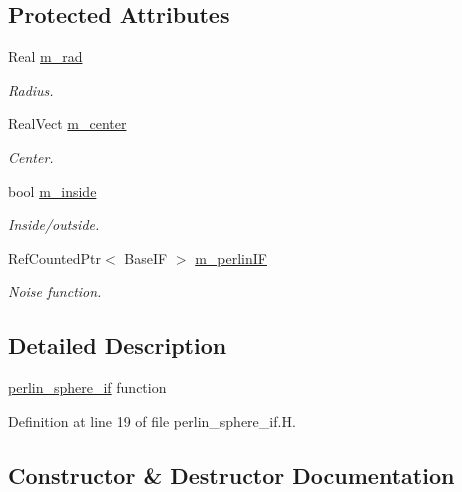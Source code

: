 \subsection*{Protected Attributes}
\begin{DoxyCompactItemize}
\item 
Real \hyperlink{classperlin__sphere__if_a85022e4151bf46031f3e04b25b6ad8b1}{m\+\_\+rad}
\begin{DoxyCompactList}\small\item\em Radius. \end{DoxyCompactList}\item 
Real\+Vect \hyperlink{classperlin__sphere__if_ab57fb2ddeecb83775ea2663d766b7314}{m\+\_\+center}
\begin{DoxyCompactList}\small\item\em Center. \end{DoxyCompactList}\item 
bool \hyperlink{classperlin__sphere__if_ad768b4a9ceca76fe0d598abda41d5f60}{m\+\_\+inside}
\begin{DoxyCompactList}\small\item\em Inside/outside. \end{DoxyCompactList}\item 
Ref\+Counted\+Ptr$<$ Base\+IF $>$ \hyperlink{classperlin__sphere__if_ad4dd515e2ecefce15080869da1ce670d}{m\+\_\+perlin\+IF}
\begin{DoxyCompactList}\small\item\em Noise function. \end{DoxyCompactList}\end{DoxyCompactItemize}


\subsection{Detailed Description}
\hyperlink{classperlin__sphere__if}{perlin\+\_\+sphere\+\_\+if} function 

Definition at line 19 of file perlin\+\_\+sphere\+\_\+if.\+H.



\subsection{Constructor \& Destructor Documentation}
